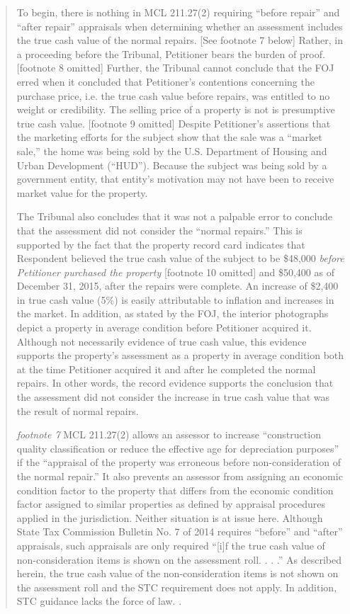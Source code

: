 \documentclass[12pt,\documentclassflag]{michiganCourtOfAppealsBrief}
\begin{document}
\begin{quotation}
To begin, there is nothing in MCL 211.27(2) requiring ``before repair'' and ``after repair'' appraisals when determining whether an assessment includes the true cash value of the normal repairs. [See footnote 7 below] Rather, in a proceeding before the Tribunal, Petitioner bears the burden of proof. [footnote 8 omitted] Further, the Tribunal cannot conclude that the FOJ erred when it concluded that Petitioner's contentions concerning the purchase price, i.e. the true cash value before repairs, was entitled to no weight or credibility. The selling price of a property is not is presumptive true cash value. [footnote 9 omitted] Despite Petitioner's assertions that the marketing efforts for the subject show that the sale was a ``market sale,'' the home was being sold by the U.S. Department of Housing and Urban Development (``HUD''). Because the subject was being sold by a government entity, that entity's motivation may not have been to receive market value for the property.

The Tribunal also concludes that it was not a palpable error to conclude that the assessment did not consider the ``normal repairs.'' This is supported by the fact that the property record card indicates that Respondent believed the true cash value of the subject to be \$48,000 \textit{before Petitioner purchased the property} [footnote 10 omitted] and \$50,400 as of December 31, 2015, after the repairs were complete. An increase of \$2,400 in true cash value (5\%) is easily attributable to inflation and increases in the market. In addition, as stated by the FOJ, the interior photographs depict a property in average condition before Petitioner acquired it. Although not necessarily evidence of true cash value, this evidence supports the property's assessment as a property in average condition both at the time Petitioner acquired it and after he completed the normal repairs. In other words, the record evidence supports the conclusion that the assessment did not consider the increase in true cash value that was the result of normal repairs.

\textit{footnote 7} MCL 211.27(2) allows an assessor to increase ``construction quality classification or reduce the effective age for depreciation purposes'' if the ``appraisal of the property was erroneous before non-consideration of the normal repair.'' It also prevents an assessor from assigning an economic condition factor to the property that differs from the economic condition factor assigned to similar properties as defined by appraisal procedures applied in the jurisdiction. Neither situation is at issue here. Although State Tax Commission Bulletin No. 7 of 2014 requires ``before'' and ``after'' appraisals, such appraisals are only required ``[i]f the true cash value of non-consideration items is shown on the assessment roll. . . .'' As described herein, the true cash value of the non-consideration items is not shown on the assessment roll and the STC requirement does not apply. In addition, STC guidance lacks the force of law. .

\end{quotation}
\end{document}

